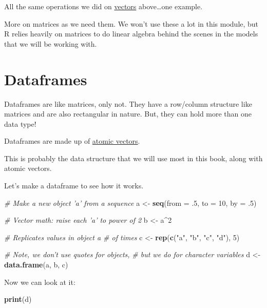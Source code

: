 \documentclass[
]{book}
\newenvironment{Shaded}{\begin{snugshade}}{\end{snugshade}}
\newcommand{\CommentTok}[1]{\textcolor[rgb]{0.56,0.35,0.01}{\textit{#1}}}
\newcommand{\DataTypeTok}[1]{\textcolor[rgb]{0.13,0.29,0.53}{#1}}
\newcommand{\DecValTok}[1]{\textcolor[rgb]{0.00,0.00,0.81}{#1}}
\newcommand{\FloatTok}[1]{\textcolor[rgb]{0.00,0.00,0.81}{#1}}
\newcommand{\KeywordTok}[1]{\textcolor[rgb]{0.13,0.29,0.53}{\textbf{#1}}}
\newcommand{\NormalTok}[1]{#1}
\newcommand{\OperatorTok}[1]{\textcolor[rgb]{0.81,0.36,0.00}{\textbf{#1}}}
\newcommand{\StringTok}[1]{\textcolor[rgb]{0.31,0.60,0.02}{#1}}
\begin{document}
All the same operations we did on \protect\hyperlink{operations}{vectors} above\ldots one example.

More on matrices as we need them. We won't use these a lot in this module, but R relies heavily on matrices to do linear algebra behind the scenes in the models that we will be working with.

\hypertarget{dataframes}{%
\section{Dataframes}\label{dataframes}}

Dataframes are like matrices, only not. They have a row/column structure like matrices and are also rectangular in nature. But, they can hold more than one data type!

Dataframes are made up of \protect\hyperlink{atomics}{atomic vectors}.

This is probably the data structure that we will use most in this book, along with atomic vectors.

Let's make a dataframe to see how it works.

\begin{Shaded}
\begin{Highlighting}[]
\CommentTok{# Make a new object 'a' from a sequence}
\NormalTok{a <-}\StringTok{ }\KeywordTok{seq}\NormalTok{(}\DataTypeTok{from =} \FloatTok{.5}\NormalTok{, }\DataTypeTok{to =} \DecValTok{10}\NormalTok{, }\DataTypeTok{by =} \FloatTok{.5}\NormalTok{)}

\CommentTok{# Vector math: raise each 'a' to power of 2}
\NormalTok{b <-}\StringTok{ }\NormalTok{a}\OperatorTok{^}\DecValTok{2}

\CommentTok{# Replicates values in object a # of times}
\NormalTok{c <-}\StringTok{ }\KeywordTok{rep}\NormalTok{(}\KeywordTok{c}\NormalTok{(}\StringTok{"a"}\NormalTok{, }\StringTok{"b"}\NormalTok{, }\StringTok{"c"}\NormalTok{, }\StringTok{"d"}\NormalTok{), }\DecValTok{5}\NormalTok{)}

\CommentTok{# Note, we don't use quotes for objects,}
\CommentTok{# but we do for character variables}
\NormalTok{d <-}\StringTok{ }\KeywordTok{data.frame}\NormalTok{(a, b, c)}
\end{Highlighting}
\end{Shaded}

Now we can look at it:

\begin{Shaded}
\begin{Highlighting}[]
\KeywordTok{print}\NormalTok{(d)}
\end{Highlighting}
\end{Shaded}
\end{document}
